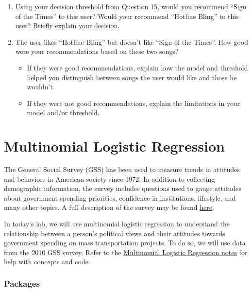 \documentclass[]{book}
\providecommand{\tightlist}{%
  \setlength{\itemsep}{0pt}\setlength{\parskip}{0pt}}
\begin{document}
\begin{enumerate}
\def\labelenumi{\arabic{enumi}.}
\setcounter{enumi}{16}
\item
  Using your decision threshold from Question 15, would you recommend
  ``Sign of the Times'' to this user? Would your recommend ``Hotline
  Bling'' to this user? Briefly explain your decision.
\item
  The user likes ``Hotline Bling'' but doesn't like ``Sign of the
  Times''. How good were your recommendations based on these two songs?

  \begin{itemize}
  \tightlist
  \item
    If they were good recommendations, explain how the model and
    threshold helped you distinguish between songs the user would like
    and those he wouldn't.
  \item
    If they were not good recommendations, explain the limitations in
    your model and/or threshold.
  \end{itemize}
\end{enumerate}

\chapter{Multinomial Logistic Regression}\label{multinom-logistic}

The General Social Survey (GSS) has been used to measure trends in
attitudes and behaviors in American society since 1972. In addition to
collecting demographic information, the survey includes questions used
to gauge attitudes about government spending priorities, confidence in
institutions, lifestyle, and many other topics. A full description of
the survey may be found
\href{http://www.norc.org/Research/Projects/Pages/general-social-survey.aspx}{here}.

In today's lab, we will use multinomial logistic regression to
understand the relationship between a person's political views and their
attitudes towards government spending on mass transportation projects.
To do so, we will use data from the 2010 GSS survey. Refer to the
\href{https://www2.stat.duke.edu/courses/Spring19/sta210.001/slides/lec-slides/18-multinomial-logistic-pt2.html\#1}{Multinomial
Logistic Regression notes} for help with concepts and code.

\subsection{Packages}\label{packages-7}
\end{document}
